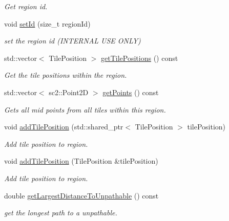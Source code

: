 \begin{DoxyCompactItemize}
\begin{DoxyCompactList}\small\item\em Get region id. \end{DoxyCompactList}\item 
void \hyperlink{classOverseer_1_1Region_a52fa1e6684d036d9f2761ec4cf85cd62}{set\+Id} (size\+\_\+t region\+Id)
\begin{DoxyCompactList}\small\item\em set the region id (I\+N\+T\+E\+R\+N\+AL U\+SE O\+N\+LY) \end{DoxyCompactList}\item 
std\+::vector$<$ Tile\+Position $>$ \hyperlink{classOverseer_1_1Region_a3977361e7b25ecc320a8a71af13c3f07}{get\+Tile\+Positions} () const
\begin{DoxyCompactList}\small\item\em Get the tile positions within the region. \end{DoxyCompactList}\item 
std\+::vector$<$ sc2\+::\+Point2D $>$ \hyperlink{classOverseer_1_1Region_a9e2a9eaeee365e31aa38528e929772d4}{get\+Points} () const
\begin{DoxyCompactList}\small\item\em Gets all mid points from all tiles within this region. \end{DoxyCompactList}\item 
void \hyperlink{classOverseer_1_1Region_aacbbc5db08289919979c40638b90ff7f}{add\+Tile\+Position} (std\+::shared\+\_\+ptr$<$ Tile\+Position $>$ tile\+Position)
\begin{DoxyCompactList}\small\item\em Add tile position to region. \end{DoxyCompactList}\item 
void \hyperlink{classOverseer_1_1Region_a95f03d39e96fdb038bfa8d55c3609896}{add\+Tile\+Position} (Tile\+Position \&tile\+Position)
\begin{DoxyCompactList}\small\item\em Add tile position to region. \end{DoxyCompactList}\item 
double \hyperlink{classOverseer_1_1Region_ac8816d6a083ad2a1fe153390b255ebfe}{get\+Largest\+Distance\+To\+Unpathable} () const
\begin{DoxyCompactList}\small\item\em get the longest path to a unpathable. \end{DoxyCompactList}\item 

\end{DoxyCompactItemize}
